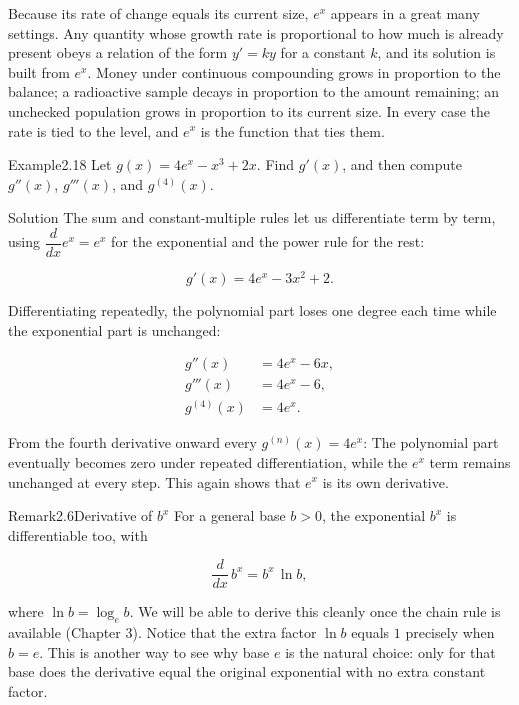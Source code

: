 \documentclass[a4paper,12pt,oneside]{memoir}
\begin{document}
Because its rate of change equals its current size, \(e^{x}\) appears in a great many settings. Any quantity whose growth rate is proportional to how much is already present obeys a relation of the form \(y' = ky\) for a constant \(k\), and its solution is built from \(e^{x}\). Money under continuous compounding grows in proportion to the balance; a radioactive sample decays in proportion to the amount remaining; an unchecked population grows in proportion to its current size. In every case the rate is tied to the level, and \(e^{x}\) is the function that ties them.

\begin{workedexample}
\begin{envexample}{Example}{2.18}{}
Let \(g(x) = 4e^{x} - x^{3} + 2x\). Find \(g'(x)\), and then compute \(g''(x)\), \(g'''(x)\), and \(g^{(4)}(x)\).
\end{envexample}
\begin{envsolution}{Solution}{}{}
The sum and constant-multiple rules let us differentiate term by term, using \(\dfrac{d}{dx}e^{x} = e^{x}\) for the exponential and the power rule for the rest:

\[ g'(x) = 4e^{x} - 3x^{2} + 2. \]

Differentiating repeatedly, the polynomial part loses one degree each time while the exponential part is unchanged:

\[ \begin{aligned}
          g''(x)   &= 4e^{x} - 6x, \\[2pt]
          g'''(x)  &= 4e^{x} - 6, \\[2pt]
          g^{(4)}(x) &= 4e^{x}.
        \end{aligned} \]

From the fourth derivative onward every \(g^{(n)}(x) = 4e^{x}\): The polynomial part eventually becomes zero under repeated differentiation, while the \(e^{x}\) term remains unchanged at every step. This again shows that \(e^{x}\) is its own derivative.
\end{envsolution}
\end{workedexample}
\begin{envremark}{Remark}{2.6}{Derivative of \(b^{x}\)}
For a general base \(b > 0\), the exponential \(b^{x}\) is differentiable too, with

\[ \frac{d}{dx}\,b^{x} = b^{x}\,\ln b, \]

where \(\ln b = \log_{e} b\). We will be able to derive this cleanly once the chain rule is available (Chapter 3). Notice that the extra factor \(\ln b\) equals \(1\) precisely when \(b = e\). This is another way to see why base \(e\) is the natural choice: only for that base does the derivative equal the original exponential with no extra constant factor.
\end{envremark}
\end{document}
